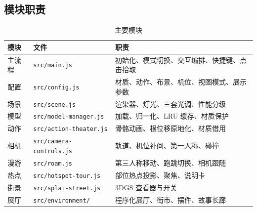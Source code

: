 \documentclass[UTF8,a4paper,11pt]{ctexart}
\begin{document}
\subsection{模块职责}
\begin{table}[H]
\centering
\small
\caption{主要模块}
\begin{tabular}{@{}p{2.4cm}p{5.0cm}p{6.9cm}@{}}
\toprule
模块 & 文件 & 职责 \\
\midrule
主流程 & \texttt{src/main.js} & 初始化、模式切换、交互编排、快捷键、点击拾取 \\
配置 & \texttt{src/config.js} & 材质、动作、布景、机位、视图模式、展示参数 \\
场景 & \texttt{src/scene.js} & 渲染器、灯光、三套光调、性能分级 \\
模型 & \texttt{src/model-manager.js} & 加载、归一化、LRU 缓存、材质保护 \\
动作 & \texttt{src/action-theater.js} & 骨骼动画、根位移原地化、材质借用 \\
相机 & \texttt{src/camera-controls.js} & 轨道、机位补间、第一人称、碰撞 \\
漫游 & \texttt{src/roam.js} & 第三人称移动、跑跳切换、相机跟随 \\
热点 & \texttt{src/hotspot-tour.js} & 部位热点投影、聚焦、说明卡 \\
街景 & \texttt{src/splat-street.js} & 3DGS 查看器与开关 \\
展厅 & \texttt{src/environment/} & 程序化展厅、街市、摆件、故事长廊 \\
\bottomrule
\end{tabular}
\end{table}
\end{document}
